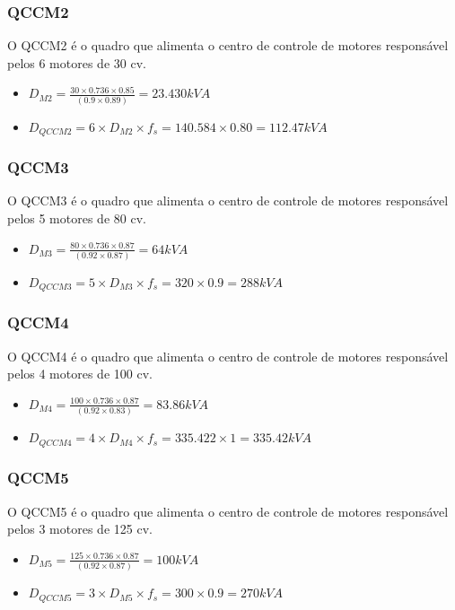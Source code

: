 \subsubsection{QCCM2}
O QCCM2 é o quadro que alimenta o centro de controle de motores responsável pelos 6 motores de 30 cv.
\begin{itemize}
\item $D_{M2}=  \frac{30\times0.736\times0.85}{(0.9\times0.89)}= 23.430kVA$
\item $D_{QCCM2} = 6\times D_{M2}\times f_s = 140.584\times0.80 = 112.47kVA$
\end{itemize}
	
\subsubsection{QCCM3}
O QCCM3 é o quadro que alimenta o centro de controle de motores responsável pelos 5 motores de 80 cv.
\begin{itemize}
\item $D_{M3}=  \frac{80\times0.736\times0.87}{(0.92\times0.87)}= 64kVA$
\item $D_{QCCM3} = 5\times D_{M3}\times f_s = 320\times0.9 = 288kVA$
\end{itemize}
	
\subsubsection{QCCM4}
O QCCM4 é o quadro que alimenta o centro de controle de motores responsável pelos 4 motores de 100 cv.
\begin{itemize}
\item $D_{M4}=  \frac{100\times0.736\times0.87}{(0.92\times0.83)}= 83.86kVA$
\item $D_{QCCM4} = 4\times D_{M4}\times f_s = 335.422\times1 = 335.42kVA$
\end{itemize}
	
\subsubsection{QCCM5}
O QCCM5 é o quadro que alimenta o centro de controle de motores responsável pelos 3 motores de 125 cv.
\begin{itemize}
\item $D_{M5}=  \frac{125\times0.736\times0.87}{(0.92\times0.87)}= 100kVA$
\item $D_{QCCM5} = 3\times D_{M5}\times f_s = 300\times0.9 = 270kVA$
\end{itemize}
	
